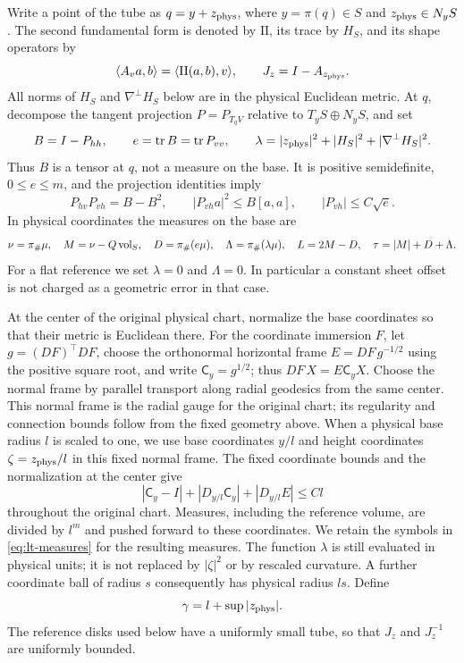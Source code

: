 Write a point of the tube as $q=y+z_{\rm phys}$, where $y=\pi(q)\in S$ and
$z_{\rm phys}\in N_yS$.  The second fundamental form is denoted by
$\mathrm{II}$, its trace by $H_S$, and its shape operators by
\[
 \langle A_v a,b\rangle=\langle\mathrm{II}(a,b),v\rangle,
 \qquad J_z=I-A_{z_{\rm phys}}.
\]
All norms of $H_S$ and $\nabla^\perp H_S$ below are in the physical Euclidean
metric.  At $q$, decompose the tangent projection $P=P_{T_qV}$ relative to
$T_yS\oplus N_yS$, and set
\begin{equation}\label{eq:lt-tensors}
 B=I-P_{hh},\qquad e=\operatorname{tr} B=\operatorname{tr} P_{vv},\qquad
 \lambda=|z_{\rm phys}|^2+|H_S|^2+|\nabla^\perp H_S|^2.
\end{equation}
Thus $B$ is a tensor at $q$, not a measure on the base.  It is positive
semidefinite, $0\le e\le m$, and the projection identities imply
\begin{equation}\label{eq:lt-projection-identities}
 P_{hv}P_{vh}=B-B^2,\qquad
 |P_{vh}a|^2\le B[a,a],\qquad |P_{vh}|\le C\sqrt e.
\end{equation}
In physical coordinates the measures on the base are
\begin{equation}\label{eq:lt-measures}
 \nu=\pi_\#\mu,\quad M=\nu-Q\operatorname{vol}_S,\quad
 D=\pi_\#(e\mu),\quad \Lambda=\pi_\#(\lambda\mu),\quad
 L=2M-D,\quad \tau=|M|+D+\Lambda.
\end{equation}
For a flat reference we set $\lambda=0$ and $\Lambda=0$.  In particular a
constant sheet offset is not charged as a geometric error in that case.

At the center of the original physical chart, normalize the base
coordinates so that their metric is Euclidean there.  For the coordinate
immersion $F$, let $g=(DF)^\top DF$, choose the orthonormal horizontal
frame $E=DF\,g^{-1/2}$ using the positive square root, and write
$\mathsf C_y=g^{1/2}$; thus $DF\,X=E\mathsf C_yX$.
Choose the normal frame by parallel transport along radial geodesics
from the same center.  This normal frame is the radial gauge for the
original chart; its regularity and connection bounds follow from the
fixed geometry above.
When a physical base radius $l$ is scaled to one, we use base coordinates
$y/l$ and height coordinates $\zeta=z_{\rm phys}/l$ in this fixed normal
frame.  The fixed coordinate bounds and the normalization at the center give
\[
 |\mathsf C_y-I|+|D_{y/l}\mathsf C_y|+|D_{y/l}E|\le Cl
\]
throughout the original chart.  Measures, including the reference volume,
are divided by $l^m$ and pushed forward to these coordinates.  We retain the
symbols in
\eqref{eq:lt-measures} for the resulting measures.  The function $\lambda$
is still evaluated in physical units; it is not replaced by
$|\zeta|^2$ or by rescaled curvature.  A further coordinate ball of radius
$s$ consequently has physical radius $ls$.  Define
\begin{equation}\label{eq:lt-small-geometry}
 \gamma=l+\sup|z_{\rm phys}|.
\end{equation}
The reference disks used below have a uniformly small tube, so that $J_z$
and $J_z^{-1}$ are uniformly bounded.

